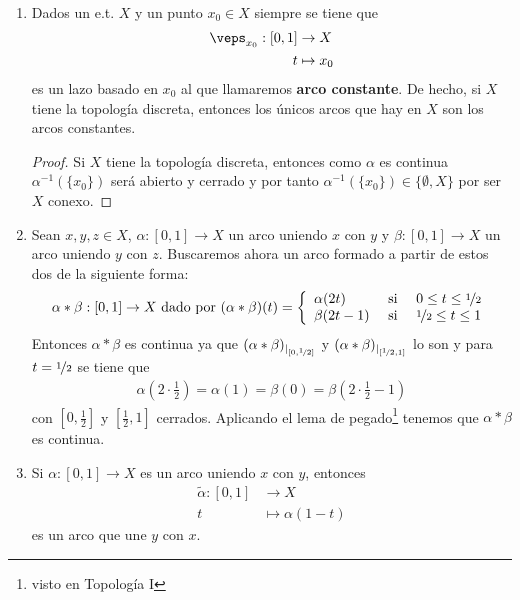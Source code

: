 \begin{ejemplo}\
    \begin{enumerate}
        \item Dados un e.t. $X$ y un punto $x_0\in X$ siempre se tiene que
        \begin{align*}
            \veps_{x_0}:[0,1]&\to X\\
            t &\mapsto x_0
        \end{align*}
        es un lazo basado en $x_0$ al que llamaremos \textbf{arco constante}. De hecho, si $X$ tiene la topología discreta, entonces los únicos arcos que hay en $X$ son los arcos constantes.
        \begin{proof}
            Si $X$ tiene la topología discreta, entonces como $\alpha$ es continua $\alpha^{-1}(\{x_0\})$ será abierto y cerrado y por tanto $\alpha^{-1}(\{x_0\})\in\{\emptyset, X\}$ por ser $X$ conexo.
        \end{proof}


        \item Sean $x,y,z\in X$, $\alpha:[0,1]\to X$ un arco uniendo $x$ con $y$ y $\beta:[0,1]\to X$ un arco uniendo $y$ con $z$. Buscaremos ahora un arco formado a partir de estos dos de la siguiente forma:
        \begin{align*}
            \alpha\ast\beta : [0,1]\to X \text{ dado por } (\alpha\ast\beta)(t) = \left\{ 
                \begin{array}{l c c}
                    \alpha(2t) & \text{ si } & 0 \leq t \leq \nicefrac{1}{2} \\
                    \beta(2t-1) & \text{ si } & \nicefrac{1}{2}\leq t \leq 1
                \end{array}
            \right.
        \end{align*}
        Entonces $\alpha\ast\beta$ es continua ya que $(\alpha\ast\beta)_{|_{[0,\nicefrac{1}{2}]}}$ y $(\alpha\ast\beta)_{|_{[\nicefrac{1}{2},1]}}$ lo son y para $t=\nicefrac{1}{2}$ se tiene que
        \begin{gather*}
            \alpha \left(2 \cdot \frac{1}{2}\right) = \alpha(1) = \beta(0) = \beta\left(2\cdot \frac{1}{2} -1\right)
        \end{gather*}
        con $\left[0, \frac{1}{2}\right]$ y $\left[\frac{1}{2}, 1\right]$ cerrados. Aplicando el lema de pegado\footnote{visto en Topología I} tenemos que $\alpha\ast \beta$ es continua.

        \item Si $\alpha:[0,1]\to X$ es un arco uniendo $x$ con $y$, entonces
        \begin{align*}
            \tilde{\alpha}:[0,1]&\to X\\
            t & \mapsto \alpha(1-t)
        \end{align*}
        es un arco que une $y$ con $x$.
    \end{enumerate}
\end{ejemplo}

